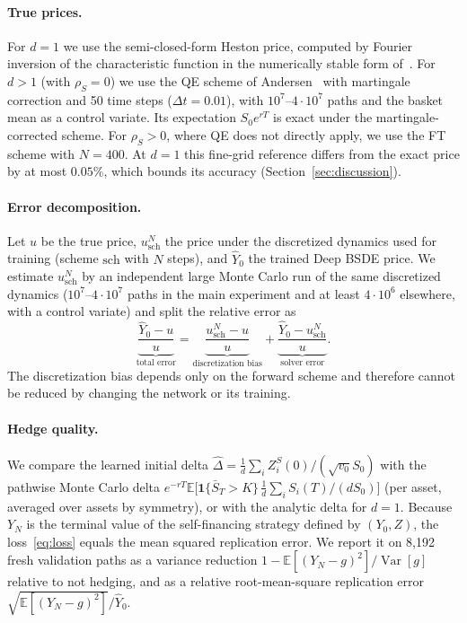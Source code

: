 \paragraph{True prices.} For $d=1$ we use the semi-closed-form Heston price, computed by Fourier inversion of the characteristic function in the numerically stable form of~\cite{albrecher2007little}. For $d>1$ (with $\rho_S=0$) we use the QE scheme of Andersen~\cite{andersen2008simple} with martingale correction and 50 time steps ($\Delta t=0.01$), with $10^7$--$4\cdot10^7$ paths and the basket mean as a control variate. Its expectation $S_0e^{rT}$ is exact under the martingale-corrected scheme. For $\rho_S>0$, where QE does not directly apply, we use the FT scheme with $N=400$. At $d=1$ this fine-grid reference differs from the exact price by at most $0.05\%$, which bounds its accuracy (Section~\ref{sec:discussion}).

\paragraph{Error decomposition.} Let $u$ be the true price, $u^{N}_{\mathrm{sch}}$ the price under the discretized dynamics used for training (scheme $\mathrm{sch}$ with $N$ steps), and $\hat Y_0$ the trained Deep BSDE price. We estimate $u^{N}_{\mathrm{sch}}$ by an independent large Monte Carlo run of the same discretized dynamics ($10^7$--$4\cdot10^7$ paths in the main experiment and at least $4\cdot10^6$ elsewhere, with a control variate) and split the relative error as
\begin{equation}\label{eq:decomp}
\underbrace{\frac{\hat Y_0-u}{u}}_{\text{total error}}
=\underbrace{\frac{u^{N}_{\mathrm{sch}}-u}{u}}_{\text{discretization bias}}
+\underbrace{\frac{\hat Y_0-u^{N}_{\mathrm{sch}}}{u}}_{\text{solver error}}.
\end{equation}
The discretization bias depends only on the forward scheme and therefore cannot be reduced by changing the network or its training.

\paragraph{Hedge quality.} We compare the learned initial delta $\hat\Delta=\frac1d\sum_i Z^S_{i}(0)/(\sqrt{v_0}S_0)$ with the pathwise Monte Carlo delta $e^{-rT}\mathbb E\bigl[\mathbf 1\{\bar S_T>K\}\,\frac1d\sum_iS_i(T)/(dS_0)\bigr]$ (per asset, averaged over assets by symmetry), or with the analytic delta for $d=1$. Because $Y_N$ is the terminal value of the self-financing strategy defined by $(Y_0,Z)$, the loss~\eqref{eq:loss} equals the mean squared replication error. We report it on 8{,}192 fresh validation paths as a variance reduction $1-\mathbb E[(Y_N-g)^2]/\operatorname{Var}[g]$ relative to not hedging, and as a relative root-mean-square replication error $\sqrt{\mathbb E[(Y_N-g)^2]}/\hat Y_0$.

